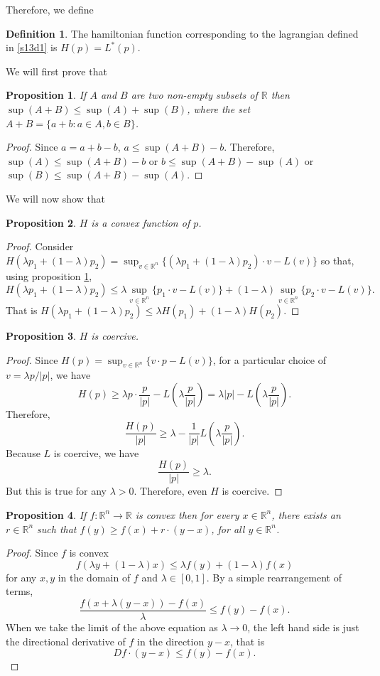 \documentclass{article}
\theoremstyle{plain}
\numberwithin{thm}{section}
\theoremstyle{plain}
\newtheorem{prop}{Proposition}
\numberwithin{prop}{section}
\theoremstyle{definition}
\newtheorem{defn}{Definition}
\numberwithin{defn}{section}
\theoremstyle{remark}
\numberwithin{equation}{section}
\begin{document}
Therefore, we define
\begin{defn}\label{s13d2}
The hamiltonian function corresponding to the lagrangian defined in \ref{s13d1} is $H(p) = L^\ast(p)$.
\end{defn}

We will first prove that
\begin{prop}\label{s13l1}
If $A$ and $B$ are two non-empty subsets of $\mathbb{R}$ then $\sup(A + B) \le \sup(A) + \sup(B)$,
where the set $A + B = \{a + b: a \in A, b \in B\}$.
\end{prop}
\begin{proof}
Since $a = a + b - b$, $a \le \sup(A + B) - b$. Therefore, $\sup(A) \le \sup(A + B) - b$ or $b \le
\sup(A + B) - \sup(A)$ or $\sup(B) \le \sup(A + B) - \sup(A)$.
\end{proof}

We will now show that
\begin{prop}\label{s13l2}
$H$ is a convex function of $p$.
\end{prop}
\begin{proof}
Consider $H(\lambda p_1 + (1 - \lambda)p_2) = \sup_{v \in \mathbb{R}^n}\{(\lambda p_1 + 
(1 - \lambda)p_2)\cdot v - L(v)\}$ so that, using proposition \ref{s13l1}, 
\[
H(\lambda p_1 + (1 - \lambda)p_2) \le 
\lambda\sup_{v \in \mathbb{R}^n}\{p_1\cdot v - L(v)\} + 
(1-\lambda)\sup_{v \in \mathbb{R}^n}\{p_2\cdot v - L(v)\}.
\]
That is $H(\lambda p_1 + (1 - \lambda)p_2) \le \lambda H(p_1) + (1 - \lambda)H(p_2)$.
\end{proof}

\begin{prop}\label{s13l3}
$H$ is coercive.
\end{prop}
\begin{proof}
Since $H(p) = \sup_{v \in \mathbb{R}^n}\{v \cdot p - L(v)\}$, for a particular choice of $v = \lambda
p/|p|$, we have
\[
H(p) \ge \lambda p \cdot \frac{p}{|p|} - L\left(\lambda\frac{p}{|p|}\right) = \lambda |p| 
- L\left(\lambda\frac{p}{|p|}\right).
\]
Therefore,
\[
\frac{H(p)}{|p|} \ge \lambda - \frac{1}{|p|}L\left(\lambda\frac{p}{|p|}\right).
\]
Because $L$ is coercive, we have
\[
\frac{H(p)}{|p|} \ge \lambda.
\]
But this is true for any $\lambda > 0$. Therefore, even $H$ is coercive.
\end{proof}

\begin{prop}\label{s13l4}
If $f:\mathbb{R}^n \rightarrow \mathbb{R}$ is convex then for every $x \in \mathbb{R}^n$, there
exists an $r \in \mathbb{R}^n$ such that $f(y) \ge f(x) + r\cdot(y - x)$, for all $y \in 
\mathbb{R}^n$.
\end{prop}
\begin{proof}
Since $f$ is convex
\[
f(\lambda y + (1 - \lambda)x) \le \lambda f(y) + (1 - \lambda) f(x)
\]
for any $x, y$ in the domain of $f$ and $\lambda \in [0, 1]$. By a simple rearrangement of terms,
\[
\frac{f(x + \lambda(y - x)) - f(x)}{\lambda} \le f(y) - f(x).
\]
When we take the limit of the above equation as $\lambda \rightarrow 0$, the left hand side is 
just the directional derivative of $f$ in the direction $y - x$, that is
\[
Df\cdot(y-x) \le f(y) - f(x).
\]
\end{proof}
\end{document}
